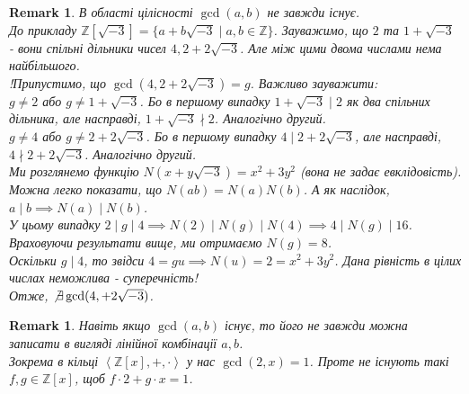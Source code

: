 \documentclass[a4paper, 10pt]{article}
\theoremstyle{theoremdd}
\theoremstyle{theoremdd}
\theoremstyle{theoremdd}
\theoremstyle{theoremdd}
\theoremstyle{theoremdd}
\theoremstyle{theoremdd}
\theoremstyle{theoremdd}
\theoremstyle{theoremdd}
\theoremstyle{theoremdd}
\theoremstyle{theoremdd}
\theoremstyle{theoremdd}
\newtheorem{remark}[theorem]{Remark}
\theoremstyle{theoremdd}
\theoremstyle{theoremdd}
\theoremstyle{theoremdd}
\theoremstyle{theoremdd}
\begin{document}
\begin{remark}
В області цілісності $\gcd(a,b)$ не завжди існує. \\
До прикладу $\mathbb{Z}[\sqrt{-3}] = \{a + b \sqrt{-3} \mid a,b \in \mathbb{Z}\}$. Зауважимо, що $2$ та $1+\sqrt{-3}$ - вони спільні дільники чисел $4,2+2 \sqrt{-3}$. Але між цими двома числами нема найбільшого.\\
!Припустимо, що $\gcd(4,2+2\sqrt{-3}) = g$. Важливо зауважити:\\
$g \neq 2$ або $g \neq 1+\sqrt{-3}$. Бо в першому випадку $1+\sqrt{-3} \mid 2$ як два спільних дільника, але насправді, $1+\sqrt{-3} \nmid 2$. Аналогічно другий.\\
$g \neq 4$ або $g \neq 2+2\sqrt{-3}$. Бо в першому випадку $4 \mid 2+2\sqrt{-3}$, але насправді, $4 \nmid 2+2\sqrt{-3}$. Аналогічно другий.\\
Ми розглянемо функцію $N(x+y\sqrt{-3}) = x^2+3y^2$ (вона не задає евклідовість). Можна легко показати, що $N(ab) = N(a)N(b)$. А як наслідок, $a \mid b \implies N(a) \mid N(b)$.\\
У цьому випадку $2 \mid g \mid 4 \implies N(2) \mid N(g) \mid N(4) \implies 4 \mid N(g) \mid 16$.\\
Враховуючи результати вище, ми отримаємо $N(g) = 8$.\\
Оскільки $g \mid 4$, то звідси $4 = gu \implies N(u) = 2 = x^2+3y^2$. Дана рівність в цілих числах неможлива - суперечність!\\
Отже, $\not\exists \gcd(4,  +2\sqrt{-3})$.
\iffalse
Маємо $2 | g | 4$. Тоді звідси $4 = gx, g = 2y \implies 4 = 2xy \implies 2 = xy$.\\
Позначимо $x=a+b\sqrt{-3}$ та $y=c+d\sqrt{-3}$, тоді звідси\\
$2 = (ac-3bd) + \sqrt{-3}(ad+bc) \implies \begin{cases} ac-3bd = 2 \\ ad+bc = 0 \end{cases}$.\\
Можна зауважити, що $d \neq 0$, бо там буде неважка суперечність. Тому домножимо на $d$ перше - отримаємо:\\
$-bc^2 - 3bd^2 = 2d$\fi
\end{remark}

\begin{remark}
Навіть якщо $\gcd(a,b)$ існує, то його не завжди можна записати в вигляді лінійної комбінації $a,b$.\\
Зокрема в кільці $\left<\mathbb{Z}[x],+,\cdot \right>$ у нас $\gcd(2,x) = 1$. Проте не існують такі $f,g \in \mathbb{Z}[x]$, щоб $f \cdot 2 + g \cdot x = 1$.
\end{remark}
\end{document}

